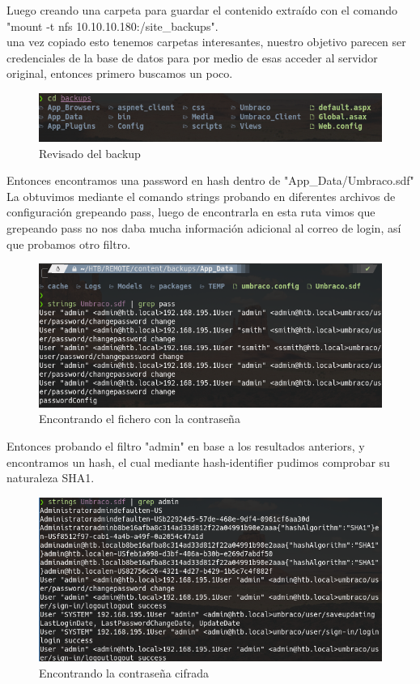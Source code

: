 \documentclass{article}
\begin{document}
Luego creando una carpeta para guardar el contenido extraído con el comando "mount -t nfs 10.10.10.180:/site\_backups".
\\ una vez copiado esto tenemos carpetas interesantes, nuestro objetivo parecen ser credenciales de la base de datos para por medio de esas acceder al servidor original, entonces primero buscamos un poco.
\begin{figure}[h]
	\center 
	\includegraphics[width=\textwidth]{images/remote/backup.png}
	\caption{Revisado del backup}
\end{figure}
Entonces encontramos una password en hash dentro de "App\_Data/Umbraco.sdf"
La obtuvimos mediante el comando strings probando en diferentes archivos de configuración grepeando pass, luego de encontrarla en esta ruta vimos que grepeando pass no nos daba mucha información adicional al correo de login, así que probamos otro filtro.
\begin{figure}[h]
	\center 
	\includegraphics[width=\textwidth]{images/remote/strings_pass.png}
	\caption{Encontrando el fichero con la contraseña}
\end{figure}

\clearpage

Entonces probando el filtro "admin" en base a los resultados anteriors, y encontramos un hash, el cual mediante hash-identifier pudimos comprobar su naturaleza SHA1.
\begin{figure}[h]
	\center 
	\includegraphics[width=\textwidth]{images/remote/strings_admin.png}
	\caption{Encontrando la contraseña cifrada}
\end{figure}
\end{document}
